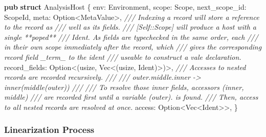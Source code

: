 \documentclass[
  a4paper,
  bibtex,
  english,
  nomenclature]{kthlatex/kththesis/kththesis}
\newenvironment{Shaded}{}{}
\newcommand{\CommentTok}[1]{\textcolor[rgb]{0.38,0.63,0.69}{\textit{#1}}}
\newcommand{\DataTypeTok}[1]{\textcolor[rgb]{0.56,0.13,0.00}{#1}}
\newcommand{\KeywordTok}[1]{\textcolor[rgb]{0.00,0.44,0.13}{\textbf{#1}}}
\newcommand{\NormalTok}[1]{#1}
\newcommand{\OperatorTok}[1]{\textcolor[rgb]{0.40,0.40,0.40}{#1}}
\begin{document}
\begin{codelisting}
\hypertarget{lst:nls-analysis-host-definition}{%
\label{lst:nls-analysis-host-definition}}%
\begin{Shaded}
\begin{Highlighting}[]
\KeywordTok{pub} \KeywordTok{struct}\NormalTok{ AnalysisHost }\OperatorTok{\{}
\NormalTok{    env}\OperatorTok{:}\NormalTok{ Environment}\OperatorTok{,}
\NormalTok{    scope}\OperatorTok{:}\NormalTok{ Scope}\OperatorTok{,}
\NormalTok{    next\_scope\_id}\OperatorTok{:}\NormalTok{ ScopeId}\OperatorTok{,}
\NormalTok{    meta}\OperatorTok{:} \DataTypeTok{Option}\OperatorTok{\textless{}}\NormalTok{MetaValue}\OperatorTok{\textgreater{},}
    \CommentTok{/// Indexing a record will store a reference to the record as}
    \CommentTok{/// well as its fields.}
    \CommentTok{/// [Self::Scope] will produce a host with a single **\textasciigrave{}pop\textasciigrave{}ed**}
    \CommentTok{/// Ident. As fields are typechecked in the same order, each}
    \CommentTok{/// in their own scope immediately after the record, which}
    \CommentTok{/// gives the corresponding record field \_term\_ to the ident}
    \CommentTok{/// useable to construct a vale declaration.}
\NormalTok{    record\_fields}\OperatorTok{:} \DataTypeTok{Option}\OperatorTok{\textless{}}\NormalTok{(}\DataTypeTok{usize}\OperatorTok{,} \DataTypeTok{Vec}\OperatorTok{\textless{}}\NormalTok{(}\DataTypeTok{usize}\OperatorTok{,}\NormalTok{ Ident)}\OperatorTok{\textgreater{}}\NormalTok{)}\OperatorTok{\textgreater{},}
    \CommentTok{/// Accesses to nested records are recorded recursively.}
    \CommentTok{/// \textasciigrave{}\textasciigrave{}\textasciigrave{}}
    \CommentTok{/// outer.middle.inner {-}\textgreater{} inner(middle(outer))}
    \CommentTok{/// \textasciigrave{}\textasciigrave{}\textasciigrave{}}
    \CommentTok{/// To resolve those inner fields, accessors (\textasciigrave{}inner\textasciigrave{}, \textasciigrave{}middle\textasciigrave{})}
    \CommentTok{/// are recorded first until a variable (\textasciigrave{}outer\textasciigrave{}). is found.}
    \CommentTok{/// Then, access to all nested records are resolved at once.}
\NormalTok{    access}\OperatorTok{:} \DataTypeTok{Option}\OperatorTok{\textless{}}\DataTypeTok{Vec}\OperatorTok{\textless{}}\NormalTok{Ident}\OperatorTok{\textgreater{}\textgreater{},}
\OperatorTok{\}}
\end{Highlighting}
\end{Shaded}

\end{codelisting}

\hypertarget{sec:linearization-process}{%
\subsubsection{Linearization Process}\label{sec:linearization-process}}
\end{document}
